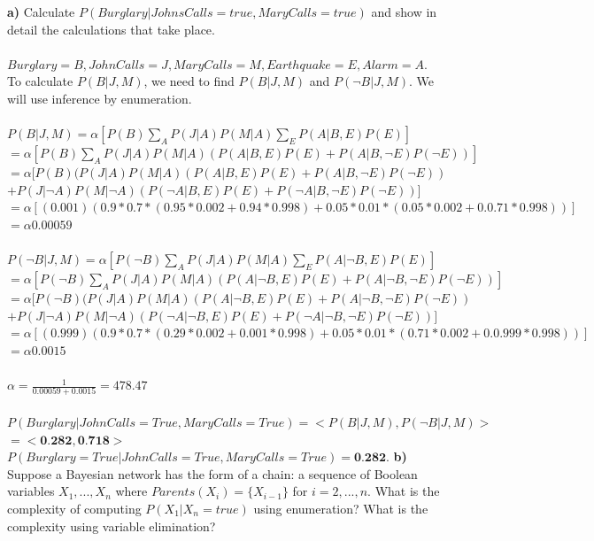 \documentclass{article}
\begin{document}
\textbf{a)} Calculate $P(Burglary|JohnsCalls=true, MaryCalls=true)$ and show in detail the calculations that take place. 
\\\\
$Burglary = B, JohnCalls = J, MaryCalls = M, Earthquake = E, Alarm = A.$\\
To calculate $P(B|J,M)$, we need to find $P(B|J,M)$ and $P(\neg B|J,M).$ We will use inference by enumeration.\\\\
$P(B|J,M) = \alpha [P(B)\sum_{A} P(J|A)P(M|A) \sum_{E} P(A|B,E)P(E)]$\\
$=\alpha [P(B)\sum_{A} P(J|A)P(M|A) (P(A|B,E)P(E)+P(A|B,\neg E)P(\neg E))] $\\
$=\alpha [P(B)(P(J|A)P(M|A)(P(A|B,E)P(E)+P(A|B,\neg E)P(\neg E))$\\
$+P(J|\neg A)P(M|\neg A)(P(\neg A|B,E)P(E)+P(\neg A|B,\neg E)P(\neg E))]$\\
$=\alpha[(0.001)(0.9*0.7*(0.95*0.002+0.94*0.998)+0.05*0.01*(0.05*0.002+0.0.71*0.998))]$\\
$=\alpha 0.00059$\\\\
$P(\neg B|J,M) = \alpha [P(\neg B)\sum_{A} P(J|A)P(M|A) \sum_{E} P(A|\neg B,E)P(E)]$\\
$=\alpha [P(\neg B)\sum_{A} P(J|A)P(M|A) (P(A|\neg B,E)P(E)+P(A|\neg B,\neg E)P(\neg E))] $\\
$=\alpha [P(\neg B)(P(J|A)P(M|A)(P(A|\neg B,E)P(E)+P(A|\neg B,\neg E)P(\neg E))$\\
$+P(J|\neg A)P(M|\neg A)(P(\neg A|\neg B,E)P(E)+P(\neg A|\neg B,\neg E)P(\neg E))]$\\
$=\alpha[(0.999)(0.9*0.7*(0.29*0.002+0.001*0.998)+0.05*0.01*(0.71*0.002+0.0.999*0.998))]$\\
$=\alpha 0.0015$\\\\
$\alpha = \frac{1}{0.00059+0.0015} = 478.47$\\\\
$P(Burglary | JohnCalls = True, MaryCalls = True) = <P(B|J,M), P(\neg B|J,M)>$\\
$= < \textbf{0.282}, \textbf{0.718}>$\\
$ P(Burglary = True | JohnCalls = True, MaryCalls = True) = \textbf{0.282}.$
\newpage
\noindent
\textbf{b)} Suppose a Bayesian network has the form of a chain: a sequence of Boolean variables $X_1,...,X_n$ where $Parents(X_i)=\{X_{i-1}\}$ for $i=2,...,n.$ What is the complexity of computing $P(X_1|X_n=true)$ using enumeration? What is the complexity using variable elimination?
\end{document}
